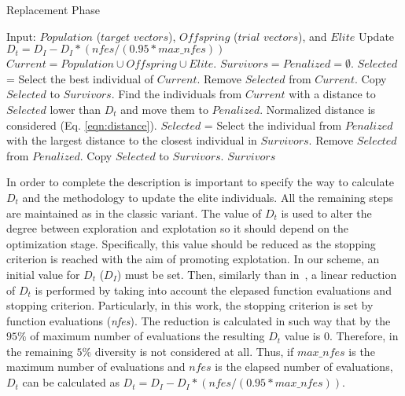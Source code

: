 \begin{algorithm}[t]
  \scriptsize
	\caption{Replacement Phase} \label{alg:Replacement}
	\begin{algorithmic}[1]
	\STATE Input: $Population$ ($target$ $vectors$), $Offspring$ ($trial$ $vectors$), and $Elite$
	\STATE Update $D_t = D_I - D_I *(nfes/(0.95*max\_nfes)) $ 
	\STATE $Current = Population \cup Offspring \cup Elite$.
	\STATE $Survivors = Penalized = \emptyset$.
	   \STATE $Selected$ = Select the best individual of $Current$.
		 \STATE Remove $Selected$ from $Current$.
	   \STATE Copy $Selected$ to $Survivors$.
	   \STATE Find the individuals from $Current$ with a distance to $Selected$ lower than $D_t$ and move them to $Penalized$. Normalized distance is considered (Eq. \ref{eqn:distance}).
	\ENDWHILE
	   \STATE $Selected$ = Select the individual from $Penalized$ with the largest distance to the closest individual in $Survivors$.
		 \STATE Remove $Selected$ from $Penalized$.
	   \STATE Copy $Selected$ to $Survivors$.
	\ENDWHILE
  \RETURN $Survivors$
\end{algorithmic}
\end{algorithm}


In order to complete the description is important to specify the way to calculate $D_t$ and the methodology to update the 
elite individuals.
%
All the remaining steps are maintained as in the classic \DE{} variant.
%
The value of $D_t$ is used to alter the degree between exploration and explotation so it should depend on the optimization stage.
%
Specifically, this value should be reduced as the stopping criterion is reached with the aim of promoting explotation.
%
In our scheme, an initial value for $D_t$ ($D_I$) must be set.
%
Then, similarly than in~\cite{segura2016novel}, a linear reduction of $D_t$ is performed by taking into account the elepased function evaluations and stopping criterion.
%
Particularly, in this work, the stopping criterion is set by function evaluations (\textit{nfes}).
%
The reduction is calculated in such way that by the $95\%$ of maximum number of evaluations the resulting $D_t$ value is $0$.
%
Therefore, in the remaining $5\%$ diversity is not considered at all.
%
Thus, if $max\_nfes$ is the maximum number of evaluations and $nfes$ is the elapsed number of evaluations, $D_t$ can be calculated as $D_t=D_I - D_I *(nfes/(0.95*max\_nfes))$.
%
%

